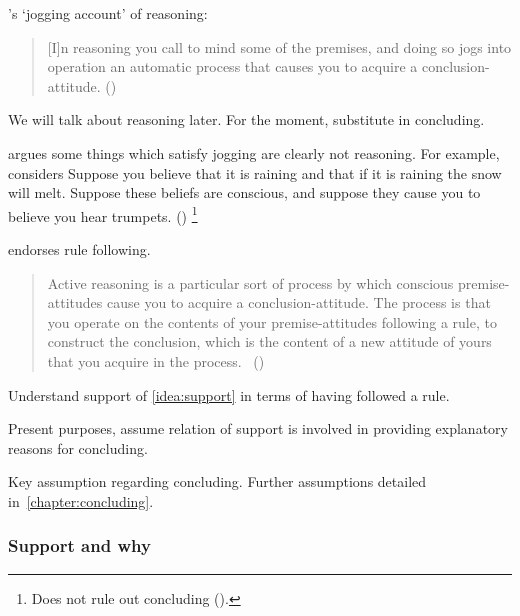 \begin{note}
  \citeauthor{Broome:2002aa}'s `jogging account' of reasoning:

  \begin{quote}
    [I]n reasoning you call to mind some of the premises, and doing so jogs into operation an automatic process that causes you to acquire a conclusion-attitude.%
    \mbox{}\hfill\mbox{(\citeyear[226]{Broome:2002aa})}
  \end{quote}

  {
    \color{red}
    We will talk about reasoning later.
    For the moment, substitute in concluding.
    }

  \citeauthor{Broome:2002aa} argues some things which satisfy jogging are clearly not reasoning.
  For example, \citeauthor{Broome:2002aa} considers
  {
    \color{red}
    Suppose you believe that it is raining and that if it is raining the snow will melt. Suppose these beliefs are conscious, and suppose they cause you to believe you hear trumpets.
  }
  (\citeyear[225,226--227]{Broome:2002aa})%
  \footnote{
    Does not rule out concluding (\citeyear[231,233]{Broome:2002aa}).
  }

  \citeauthor{Broome:2002aa} endorses rule following.

  \begin{quote}
    Active reasoning is a particular sort of process by which conscious premise-attitudes cause you to acquire a conclusion-attitude.
    The process is that you operate on the contents of your premise-attitudes following a rule, to construct the conclusion, which is the content of a new attitude of yours that you acquire in the process.\newline
    \mbox{ }\hfill\mbox{(\citeyear[234]{Broome:2002aa})}
  \end{quote}

  Understand support of \autoref{idea:support} in terms of having followed a rule.
\end{note}

\begin{note}
  Present purposes, assume relation of support is involved in providing explanatory reasons for concluding.
\end{note}

\begin{note}
  Key assumption regarding concluding.
  Further assumptions detailed in~\autoref{chapter:concluding}.
\end{note}

\subsubsection{Support and why}

